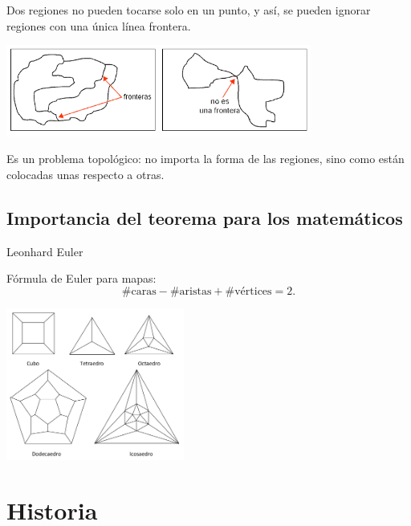 \documentclass[spanish,utf8]{beamer}
\begin{document}
\begin{frame}{\insertsection}
\begin{block}{}
Dos regiones no pueden tocarse solo en un punto, y así, se pueden ignorar regiones con una única línea frontera.
\end{block}
\begin{center}
\includegraphics[height=3cm]{fronteras.png}
\end{center}

\begin{block}{}
Es un problema topológico: no importa la forma de las regiones, sino como están colocadas unas respecto a otras.
\end{block}
\end{frame}
\subsection{Importancia del teorema para los matemáticos}

\begin{frame}{\insertsection}\transblindsvertical
Leonhard Euler
\begin{block}{Fórmula de Euler para mapas:}
$$
\#\text{caras} - \#\text{aristas} + \#\text{vértices} = 2.
$$
\end{block}
\begin{center}
   \includegraphics[height=5cm]{poliedros2.jpg}
\end{center}
\end{frame}
\section{Historia}
\end{document}

